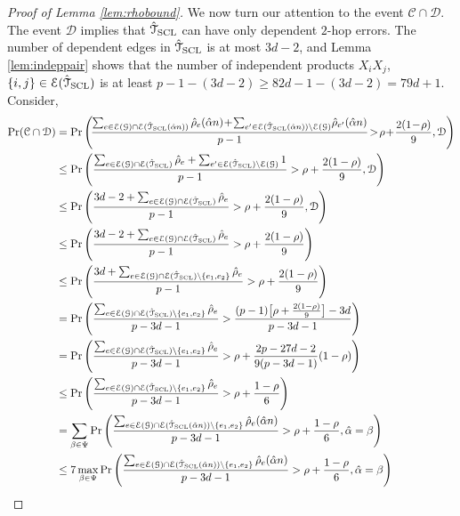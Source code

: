 \documentclass[11pt,onecolumn]{article}
\newcommand{\calC}{\mathcal{C}}
\newcommand{\calD}{\mathcal{D}}
\newcommand{\calE}{\mathcal{E}}
\newcommand{\calG}{\mathcal{G}}
\newcommand{\calT}{\mathcal{T}}
\newcommand{\hatcalT}{\hat{\calT}}
\newcommand{\halpha}{\hat{\alpha}}
\newcommand{\hrho}{\hat{\rho}}
\begin{document}
\begin{proof}[Proof of Lemma \ref{lem:rhobound}]
	We now turn our attention to the event $ \calC\cap \calD$. The event $\calD$ implies that $ \hatcalT_{\rm{SCL}}$ can have only dependent $2$-hop errors. The number
	of dependent edges in $ \hatcalT_{\rm{SCL}}$ is at most $3d-2$, and Lemma \ref{lem:indeppair} shows that the number of independent products $X_{i}X_{j}$, $\{i,j\}\in\calE(\hatcalT_{{\rm SCL}})$ 
	is at least $p-1-(3d-2)\geq 82d-1-(3d-2)=79d+1$. Consider,
	\begin{align}
		\Pr( \calC\cap \calD)&=\Pr\Bigg(\!\frac{\sum_{e\in\calE(\calG)\cap\calE( \hatcalT_{\rm{SCL}}(\halpha n))}\hrho_{e}(\halpha n)\!+\!\sum_{e^{\prime}\in\calE( \hatcalT_{\rm{SCL}}(\halpha n))\backslash\calE(\calG)}\!\hrho_{e^{\prime}}(\halpha n)}{p-1}\!>\!\rho\!+\!\frac{2(1\!-\!\rho)}{9},\calD\Bigg)\\
		&\leq\Pr\Bigg(\frac{\sum_{e\in\calE(\calG)\cap\calE( \hatcalT_{\rm{SCL}})}\hrho_{e}+\sum_{e^{\prime}\in\calE( \hatcalT_{\rm{SCL}})\backslash\calE(\calG)}1}{p-1}>\rho+\frac{2(1-\rho)}{9},\calD\Bigg)\\
		&\leq\Pr\Bigg(\frac{3d-2+\sum_{e\in\calE(\calG)\cap\calE( \hatcalT_{\rm{SCL}})}\hrho_{e}}{p-1}>\rho+\frac{2(1-\rho)}{9},\calD\Bigg)\label{ieq:ieq2}\\
		&\leq\Pr\Bigg(\frac{3d-2+\sum_{e\in\calE(\calG)\cap\calE( \hatcalT_{\rm{SCL}})}\hrho_{e}}{p-1}>\rho+\frac{2(1-\rho)}{9}\Bigg)\\
		&\leq\Pr\Bigg(\frac{3d+\sum_{e\in\calE(\calG)\cap\calE( \hatcalT_{\rm{SCL}})\backslash \{e_{1},e_{2}\}}\hrho_{e}}{p-1}>\rho+\frac{2(1-\rho)}{9}\Bigg)\label{ieq:ieq3}\\
		&=\Pr\Bigg(\frac{\sum_{e\in\calE(\calG)\cap\calE( \hatcalT_{\rm{SCL}})\backslash \{e_{1},e_{2}\}}\hrho_{e}}{p-3d-1}>\frac{(p-1)\big[\rho+\frac{2(1-\rho)}{9}\big]-3d}{p-3d-1}\Bigg)\\
		&=\Pr\Bigg(\frac{\sum_{e\in\calE(\calG)\cap\calE( \hatcalT_{\rm{SCL}})\backslash \{e_{1},e_{2}\}}\hrho_{e}}{p-3d-1}>\rho+\frac{2p-27d-2}{9(p-3d-1)}(1-\rho)\Bigg)\\
		&\leq\Pr\Bigg(\frac{\sum_{e\in\calE(\calG)\cap\calE( \hatcalT_{\rm{SCL}})\backslash \{e_{1},e_{2}\}}\hrho_{e}}{p-3d-1}>\rho+\frac{1-\rho}{6}\Bigg)\label{ieq:ieq5}\\
		&=\sum_{\beta\in\Psi}\Pr\Bigg(\frac{\sum_{e\in\calE(\calG)\cap\calE( \hatcalT_{\rm{SCL}}(\halpha n))\backslash \{e_{1},e_{2}\}}\hrho_{e}(\halpha n)}{p-3d-1}>\rho+\frac{1-\rho}{6},\halpha=\beta\Bigg)\label{eq:ome}\\
		&\leq 7\max_{\beta \in \Psi}\Pr\Bigg(\frac{\sum_{e\in\calE(\calG)\cap\calE( \hatcalT_{\rm{SCL}}(\halpha n))\backslash \{e_{1},e_{2}\}}\hrho_{e}(\halpha n)}{p-3d-1}>\rho+\frac{1-\rho}{6},\halpha=\beta\Bigg)\\

\end{align}
\end{proof}
\end{document}
